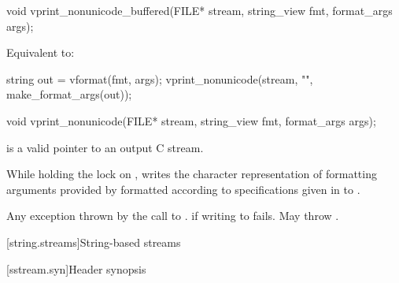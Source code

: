 %
\begin{itemdecl}
void vprint_nonunicode_buffered(FILE* stream, string_view fmt, format_args args);
\end{itemdecl}

\begin{itemdescr}
\pnum
\effects
Equivalent to:
\begin{codeblock}
string out = vformat(fmt, args);
vprint_nonunicode(stream, "{}", make_format_args(out));
\end{codeblock}
\end{itemdescr}

%
\begin{itemdecl}
void vprint_nonunicode(FILE* stream, string_view fmt, format_args args);
\end{itemdecl}

\begin{itemdescr}
\pnum
\expects
{} is a valid pointer to an output C stream.

\pnum
\effects
While holding the lock on ,
writes the character representation of
formatting arguments provided by 
formatted according to specifications given in  to .

\pnum
\throws
Any exception thrown by the call to .
 if writing to  fails.
May throw .
\end{itemdescr}

[string.streams]{String-based streams}

[sstream.syn]{Header  synopsis}

